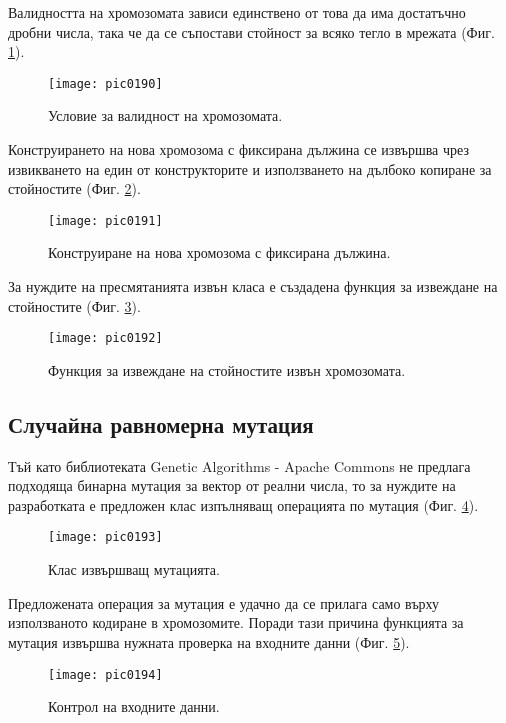 Валидността на хромозомата зависи единствено от това да има достатъчно дробни числа, така че да се съпостави стойност за всяко тегло в мрежата (Фиг. \ref{fig:pic0190}).

\begin{figure}[h]
  \centering
  \texttt{[image: pic0190]}
  \caption{Условие за валидност на хромозомата.}
\label{fig:pic0190}
\end{figure}
\FloatBarrier

Конструирането на нова хромозома с фиксирана дължина се извършва чрез извикването на един от конструкторите и използването на дълбоко копиране за стойностите (Фиг. \ref{fig:pic0191}).

\begin{figure}[h]
  \centering
  \texttt{[image: pic0191]}
  \caption{Конструиране на нова хромозома с фиксирана дължина.}
\label{fig:pic0191}
\end{figure}
\FloatBarrier

За нуждите на пресмятанията извън класа е създадена функция за извеждане на стойностите (Фиг. \ref{fig:pic0192}).

\begin{figure}[h]
  \centering
  \texttt{[image: pic0192]}
  \caption{Функция за извеждане на стойностите извън хромозомата.}
\label{fig:pic0192}
\end{figure}
\FloatBarrier

\subsection{Случайна равномерна мутация}

Тъй като библиотеката Genetic Algorithms - Apache Commons не предлага подходяща бинарна мутация за вектор от реални числа, то за нуждите на разработката е предложен клас изпълняващ операцията по мутация (Фиг. \ref{fig:pic0193}).

\begin{figure}[h]
  \centering
  \texttt{[image: pic0193]}
  \caption{Клас извършващ мутацията.}
\label{fig:pic0193}
\end{figure}
\FloatBarrier

Предложената операция за мутация е удачно да се прилага само върху използваното кодиране в хромозомите. Поради тази причина функцията за мутация извършва нужната проверка на входните данни (Фиг. \ref{fig:pic0194}).

\begin{figure}[h]
  \centering
  \texttt{[image: pic0194]}
  \caption{Контрол на входните данни.}
\label{fig:pic0194}
\end{figure}
\FloatBarrier

